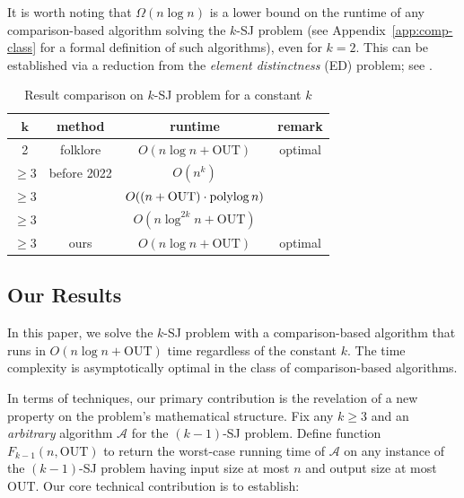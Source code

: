 \documentclass[sigconf]{acmart}
\def\vgap{\vspace{0mm}}
\def\figcapup{\vspace{-2mm}}
\def\figcapdown{\vspace{-2mm}}
\def\A{\mathcal{A}}
\def\out{\mathrm{OUT}}
\begin{document}
\vgap 

It is worth noting that $\Omega(n \log n)$ is a lower bound on the runtime of any comparison-based algorithm  solving the $k$-SJ problem (see Appendix~\ref{app:comp-class} for a formal definition of such algorithms), even for $k = 2$. This can be established via a reduction from the {\em element distinctness} (ED) problem; see \cite{dl79}.


\begin{table} 
    \begin{tabular}{c|c|c|c} 
        $\bm{k}$ & {\bf method} & {\bf runtime} & {\bf remark} \\
        \hline\hline 
        2 & folklore & $O(n \log n + \out)$ & optimal \\ 
        \hline
        $\ge 3$ & before 2022 & $O(n^k)$ &  \\
        $\ge 3$ & \cite{ty22} & $O((n + \out) \cdot \polylog n)$ & \\
        $\ge 3$ & \cite{kcko22} & $O(n \log^{2k} n + \out)$ & \\
        \hline
        $\ge 3$ & ours & $O(n \log n + \out)$ & optimal
    \end{tabular}
    
    \vspace{3mm}
    \figcapup 
    \caption{Result comparison on $k$-SJ problem for a constant $k$}
    \label{tab:results-com}
    \figcapdown \vspace{-5mm}
\end{table}

\subsection{Our Results} \label{sec:intro:ours} 

In this paper, we solve the $k$-SJ problem with a comparison-based algorithm that runs in $O(n \log n + \out)$ time regardless of the constant $k$. The time complexity is asymptotically optimal in the class of comparison-based algorithms.

\vgap 

In terms of techniques, our primary contribution is the revelation of a new property on the problem's mathematical structure. Fix any $k \ge 3$ and an {\em arbitrary} algorithm $\A$ for the $(k-1)$-SJ problem. Define function $F_{k-1}(n, \out)$ to return the worst-case running time of $\A$ on any instance of the $(k-1)$-SJ problem having input size at most $n$ and output size at most $\out$. Our core technical contribution is to establish:
\end{document}
